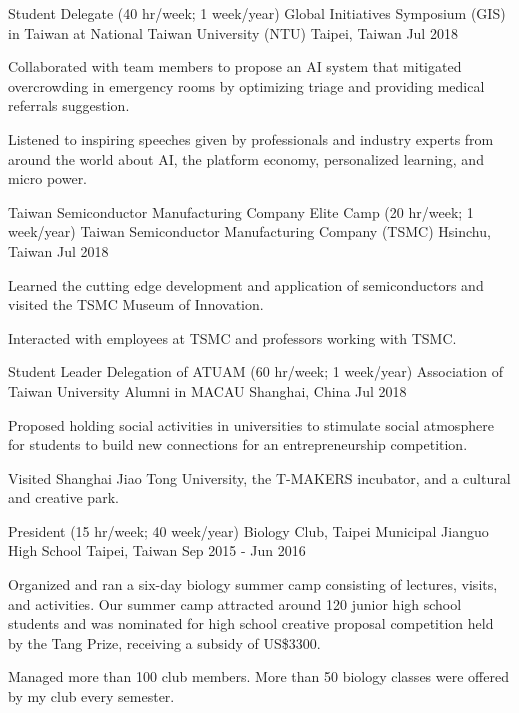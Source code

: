 \begin{cventries}
    \cventry
    {Student Delegate (40 hr/week; 1 week/year)} %
    {Global Initiatives Symposium (GIS) in Taiwan at National Taiwan University (NTU)} %
    {Taipei, Taiwan} %
    {Jul 2018} %
    {
	\begin{cvitems} %
      	\item Collaborated with team members to propose an AI system that mitigated overcrowding in emergency rooms by optimizing triage and providing medical referrals suggestion. 
      	\item Listened to inspiring speeches given by professionals and industry experts from around the world about AI, the platform economy, personalized learning, and micro power.
	\end{cvitems}
    }  
    
    \cventry
    {Taiwan Semiconductor Manufacturing Company Elite Camp (20 hr/week; 1 week/year)} %
    {Taiwan Semiconductor Manufacturing Company (TSMC)} %
    {Hsinchu, Taiwan} %
    {Jul 2018} %
    {
	\begin{cvitems} %
      	\item Learned the cutting edge development and application of semiconductors and visited the TSMC Museum of Innovation. 
      	\item Interacted with employees at TSMC and professors working with TSMC.
	\end{cvitems}
    } 
    
     \cventry
    {Student Leader Delegation of ATUAM (60 hr/week; 1 week/year)} %
    {Association of Taiwan University Alumni in MACAU} %
    {Shanghai, China} %
    {Jul 2018} %
    {
	\begin{cvitems} %
      	\item Proposed holding social activities in universities to stimulate social atmosphere for students to build new connections for an entrepreneurship competition. 
      	\item Visited Shanghai Jiao Tong University, the T-MAKERS incubator, and a cultural and creative park.
	\end{cvitems}
    } 
    
    \cventry
    {President (15 hr/week; 40 week/year)} %
    {Biology Club, Taipei Municipal Jianguo High School} %
    {Taipei, Taiwan} %
    {Sep 2015 - Jun 2016} %
    {
	\begin{cvitems} %
      	\item Organized and ran a six-day biology summer camp consisting of lectures, visits, and activities. Our summer camp attracted around 120 junior high school students and was nominated for high school creative proposal competition held by the Tang Prize, receiving a subsidy of US\$3300. 
      	\item Managed more than 100 club members. More than 50 biology classes were offered by my club every semester.
	\end{cvitems}
    } 
    

\end{cventries}
